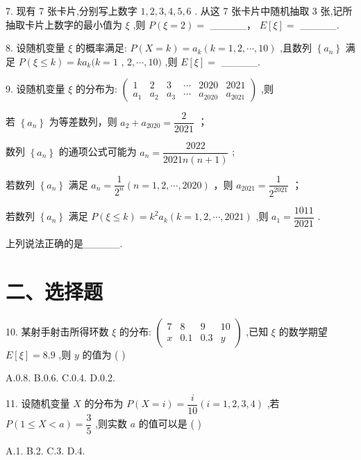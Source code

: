 7. 现有 7 张卡片,分别写上数字 $1,2,3,4,5,6$ . 从这 7 张卡片中随机抽取 3 张,记所抽取卡片上数字的最小值为 $\xi$ ,则 $P\left( {\xi  = 2}\right)  =$ \_\_\_\_\_， $E\left\lbrack  \xi \right\rbrack   =$ \_\_\_\_\_.

8. 设随机变量 $\xi$ 的概率满足: $P\left( {X = k}\right)  = {a}_{k}\left( {k = 1,2,\cdots ,{10}}\right)$ ,且数列 $\left\{  {a}_{n}\right\}$ 满足 $P\left( {\xi  \leq  k}\right)  = k{a}_{k}(k = 1$ , $2,\cdots ,{10})$ ,则 $E\left\lbrack  \xi \right\rbrack   =$ \_\_\_\_\_.

9. 设随机变量 $\xi$ 的分布为: $\left( \begin{matrix} 1 & 2 & 3 & \cdots & {2020} & {2021} \\  {a}_{1} & {a}_{2} & {a}_{3} & \cdots & {a}_{2020} & {a}_{2021} \end{matrix}\right)$ ,则

   若 $\left\{  {a}_{n}\right\}$ 为等差数列，则 ${a}_{2} + {a}_{2020} = \dfrac{2}{2021}$ ；

  数列 $\left\{  {a}_{n}\right\}$ 的通项公式可能为 ${a}_{n} = \dfrac{2022}{{2021n}\left( {n + 1}\right) }$ ;

   若数列 $\left\{  {a}_{n}\right\}$ 满足 ${a}_{n} = \dfrac{1}{{2}^{n}}\left( {n = 1,2,\cdots ,{2020}}\right)$ ，则 ${a}_{2021} = \dfrac{1}{{2}^{2021}}$ ；

  若数列 $\left\{  {a}_{n}\right\}$ 满足 $P\left( {\xi  \leq  k}\right)  = {k}^{2}{a}_{k}\left( {k = 1,2,\cdots ,{2021}}\right)$ ,则 ${a}_{1} = \dfrac{1011}{2021}$ .

上列说法正确的是\_\_\_\_\_.

\section*{二、选择题}

10. 某射手射击所得环数 $\xi$ 的分布: $\left( \begin{matrix} 7 & 8 & 9 & {10} \\  x & {0.1} & {0.3} & y \end{matrix}\right)$ ,已知 $\xi$ 的数学期望 $E\left\lbrack  \xi \right\rbrack   = {8.9}$ ,则 $y$ 的值为 ( )

A.0.8. B.0.6. C.0.4. D.0.2.

11. 设随机变量 $X$ 的分布为 $P\left( {X = i}\right)  = \dfrac{i}{10}\left( {i = 1,2,3,4}\right)$ ,若 $P\left( {1 \leq  X < a}\right)  = \dfrac{3}{5}$ ,则实数 $a$ 的值可以是 ( )

A.1. B.2. C.3. D.4.


